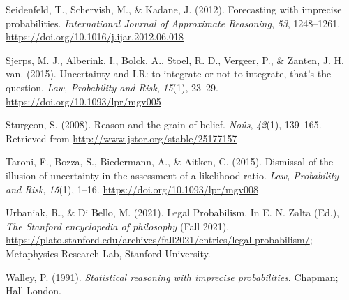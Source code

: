 \documentclass[
  10pt,
  dvipsnames,enabledeprecatedfontcommands]{scrartcl}
\newlength{\cslhangindent}
\newenvironment{CSLReferences}[2] %
 {\begin{list}{}{%
  \setlength{\itemindent}{0pt}
  \setlength{\leftmargin}{0pt}
  \setlength{\parsep}{0pt}
  \ifodd #1
   \setlength{\leftmargin}{\cslhangindent}
   \setlength{\itemindent}{-1\cslhangindent}
  \fi
  \setlength{\itemsep}{#2\baselineskip}}}
 {\end{list}}
\begin{document}
\begin{CSLReferences}{1}{0}
Seidenfeld, T., Schervish, M., \& Kadane, J. (2012). Forecasting with
imprecise probabilities. \emph{International Journal of Approximate
Reasoning}, \emph{53}, 1248--1261.
\url{https://doi.org/10.1016/j.ijar.2012.06.018}

Sjerps, M. J., Alberink, I., Bolck, A., Stoel, R. D., Vergeer, P., \&
Zanten, J. H. van. (2015). {Uncertainty and LR: to integrate or not to
integrate, that's the question}. \emph{Law, Probability and Risk},
\emph{15}(1), 23--29. \url{https://doi.org/10.1093/lpr/mgv005}

Sturgeon, S. (2008). Reason and the grain of belief. \emph{No{û}s},
\emph{42}(1), 139--165. Retrieved from
\url{http://www.jstor.org/stable/25177157}

Taroni, F., Bozza, S., Biedermann, A., \& Aitken, C. (2015). {Dismissal
of the illusion of uncertainty in the assessment of a likelihood ratio}.
\emph{Law, Probability and Risk}, \emph{15}(1), 1--16.
\url{https://doi.org/10.1093/lpr/mgv008}

Urbaniak, R., \& Di Bello, M. (2021). {Legal Probabilism}. In E. N.
Zalta (Ed.), \emph{The {Stanford} encyclopedia of philosophy} (Fall
2021).
\url{https://plato.stanford.edu/archives/fall2021/entries/legal-probabilism/};
Metaphysics Research Lab, Stanford University.

Walley, P. (1991). \emph{Statistical reasoning with imprecise
probabilities}. Chapman; Hall London.

\end{CSLReferences}
\end{document}
